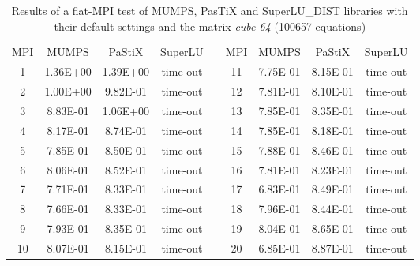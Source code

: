 \begin{table}[ht]
\centering
\begin{tabular}{|c|c|c|c|l|c|c|c|c|}
\cline{1-4} \cline{6-9}
MPI & MUMPS    & PaStiX   & SuperLU  &  & MPI & MUMPS    & PaStiX   & SuperLU  \\ \cline{1-4} \cline{6-9} 
1   & 1.36E+00 & 1.39E+00 & time-out &  & 11  & 7.75E-01 & 8.15E-01 & time-out \\ \cline{1-4} \cline{6-9} 
2   & 1.00E+00 & 9.82E-01 & time-out &  & 12  & 7.81E-01 & 8.10E-01 & time-out \\ \cline{1-4} \cline{6-9} 
3   & 8.83E-01 & 1.06E+00 & time-out &  & 13  & 7.85E-01 & 8.35E-01 & time-out \\ \cline{1-4} \cline{6-9} 
4   & 8.17E-01 & 8.74E-01 & time-out &  & 14  & 7.85E-01 & 8.18E-01 & time-out \\ \cline{1-4} \cline{6-9} 
5   & 7.85E-01 & 8.50E-01 & time-out &  & 15  & 7.88E-01 & 8.46E-01 & time-out \\ \cline{1-4} \cline{6-9} 
6   & 8.06E-01 & 8.52E-01 & time-out &  & 16  & 7.81E-01 & 8.23E-01 & time-out \\ \cline{1-4} \cline{6-9} 
7   & 7.71E-01 & 8.33E-01 & time-out &  & 17  & 6.83E-01 & 8.49E-01 & time-out \\ \cline{1-4} \cline{6-9} 
8   & 7.66E-01 & 8.33E-01 & time-out &  & 18  & 7.96E-01 & 8.44E-01 & time-out \\ \cline{1-4} \cline{6-9} 
9   & 7.93E-01 & 8.35E-01 & time-out &  & 19  & 8.04E-01 & 8.65E-01 & time-out \\ \cline{1-4} \cline{6-9} 
10  & 8.07E-01 & 8.15E-01 & time-out &  & 20  & 6.85E-01 & 8.87E-01 & time-out \\ \cline{1-4} \cline{6-9} 
\end{tabular}
\caption{Results of a flat-MPI test of MUMPS, PasTiX and SuperLU\_DIST libraries with their default settings and the matrix \textit{cube-64} (100657 equations)}
\label{table:lc-cube-64-result}
\end{table}


